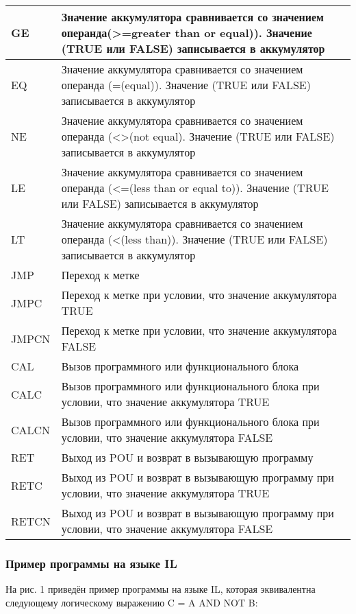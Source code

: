 \documentclass[letterpaper,10pt,russian]{sphinxmanual}
\begin{document}
\begin{longtable}{|l|l|}
\\
\hline
GE
&
Значение аккумулятора сравнивается со значением операнда(\textgreater{}=greater than or equal)). Значение (TRUE или FALSE) записывается в аккумулятор
\\
\hline
EQ
&
Значение аккумулятора сравнивается со значением операнда (=(equal)). Значение (TRUE или FALSE) записывается в аккумулятор
\\
\hline
NE
&
Значение аккумулятора сравнивается со значением операнда (\textless{}\textgreater{}(not equal). Значение (TRUE или FALSE) записывается в аккумулятор
\\
\hline
LE
&
Значение аккумулятора сравнивается со значением операнда (\textless{}=(less than or equal to)). Значение (TRUE или FALSE) записывается в аккумулятор
\\
\hline
LT
&
Значение аккумулятора сравнивается со значением операнда (\textless{}(less than)). Значение (TRUE или FALSE) записывается в аккумулятор
\\
\hline
JMP
&
Переход к метке
\\
\hline
JMPC
&
Переход к метке при условии, что значение аккумулятора TRUE
\\
\hline
JMPCN
&
Переход к метке при условии, что значение аккумулятора FALSE
\\
\hline
CAL
&
Вызов программного или функционального блока
\\
\hline
CALC
&
Вызов программного или функционального блока при условии, что значение аккумулятора TRUE
\\
\hline
CALCN
&
Вызов программного или функционального блока при условии, что значение аккумулятора FALSE
\\
\hline
RET
&
Выход из POU и возврат в вызывающую программу
\\
\hline
RETC
&
Выход из POU и возврат в вызывающую программу при условии, что значение аккумулятора TRUE
\\
\hline
RETCN
&
Выход из POU и возврат в вызывающую программу при условии, что значение аккумулятора FALSE
\\
\hline\end{longtable}



\subsubsection{Пример программы на языке IL}
\label{iec_guide/il_guide:id3}
На рис. 1 приведён пример программы на языке IL, которая эквивалентна
следующему логическому выражению C = A AND NOT B:
\end{document}
